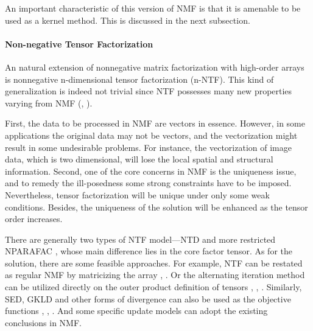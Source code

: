 \documentclass[letterpaper,12pt]{article}
\begin{document}
An important characteristic of this version of NMF is that it is amenable to be used as a kernel method. This is discussed in the next subsection.

\paragraph{Non-negative Tensor Factorization}%


An natural extension of nonnegative matrix factorization with high-order arrays is nonnegative n-dimensional tensor factorization (n-NTF). This kind of generalization is indeed not trivial since NTF possesses many new properties varying from NMF (\cite{Hazan2005}, \cite{Morup2008}).  

First, the data to be processed in NMF are vectors in essence. However, in some applications the original data may not be vectors, and the vectorization might result in some undesirable problems. For instance, the vectorization of image data, which is two dimensional, will lose the local spatial and structural information. Second, one of the core concerns in NMF is the uniqueness issue, and to remedy the ill-posedness some strong constraints have to be imposed. Nevertheless, tensor factorization will be unique under only some weak conditions. Besides, the uniqueness of the solution will be enhanced as the tensor order increases\cite{Wang2013}.

There are generally two types of NTF model—NTD \cite{Morup2008} and more restricted NPARAFAC \cite{Hazan2005}, whose main difference lies in the core factor tensor. As for the solution, there are some feasible approaches. For example, NTF can be restated as regular NMF by matricizing the array \cite{Welling2001}, \cite{Morup2008}. Or the alternating iteration method can be utilized directly on the outer product definition of tensors \cite{Hazan2005}, \cite{Shashua2005}, \cite{Benetos2010}. Similarly, SED, GKLD and other forms of divergence can also be used as the objective functions \cite{Benetos2010}, \cite{Cichocki2007}, \cite{Zafeiriou2011}. And some specific update models can adopt the existing conclusions in NMF. %

\end{document}
